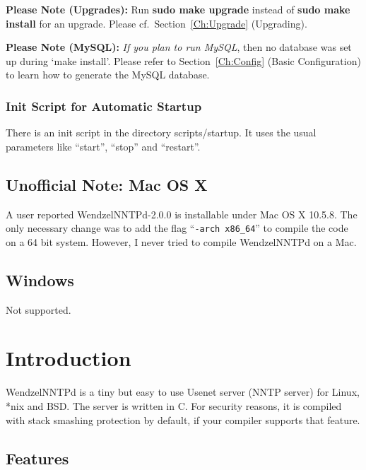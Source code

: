 \documentclass[12pt,fleqn,leqno]{scrbook}
\begin{document}
\textbf{Please Note (Upgrades):} Run \textbf{sudo make upgrade} instead
of \textbf{sudo make install} for an upgrade. Please
cf.~Section~\protect\hyperlink{Ch:Upgrade}{{[}Ch:Upgrade{]}}
(Upgrading).

\textbf{Please Note (MySQL):} \emph{If you plan to run MySQL}, then no
database was set up during `make install'. Please refer to
Section~\protect\hyperlink{Ch:Config}{{[}Ch:Config{]}} (Basic
Configuration) to learn how to generate the MySQL database.

\hypertarget{init-script-for-automatic-startup-1}{%
\subsubsection{Init Script for Automatic
Startup}\label{init-script-for-automatic-startup-1}}

There is an init script in the directory scripts/startup. It uses the
usual parameters like ``start'', ``stop'' and ``restart''.

\hypertarget{unofficial-note-mac-os-x-1}{%
\subsection{Unofficial Note: Mac OS
X}\label{unofficial-note-mac-os-x-1}}

A user reported WendzelNNTPd-2.0.0 is installable under Mac OS X 10.5.8.
The only necessary change was to add the flag
``\texttt{-arch\ x86\_64}'' to compile the code on a 64 bit system.
However, I never tried to compile WendzelNNTPd on a Mac.

\hypertarget{windows-1}{%
\subsection{Windows}\label{windows-1}}

Not supported.

\hypertarget{introduction-1}{%
\section{Introduction}\label{introduction-1}}

WendzelNNTPd is a tiny but easy to use Usenet server (NNTP server) for
Linux, *nix and BSD. The server is written in C. For security reasons,
it is compiled with stack smashing protection by default, if your
compiler supports that feature.

\hypertarget{features-1}{%
\subsection{Features}\label{features-1}}
\end{document}
